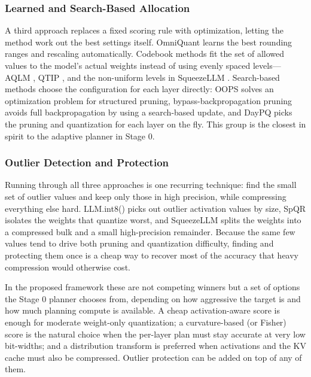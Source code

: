 \documentclass[
11pt, %
english, %
singlespacing, %
headsepline, %
]{MastersDoctoralThesis} %
\begin{document}
\subsubsection{Learned and Search-Based Allocation}

A third approach replaces a fixed scoring rule with optimization, letting the method work out the best settings itself. OmniQuant \cite{shao2024omniquant} learns the best rounding ranges and rescaling automatically. Codebook methods fit the set of allowed values to the model's actual weights instead of using evenly spaced levels---AQLM \cite{egiazarian2024aqlm}, QTIP \cite{tseng2024qtip}, and the non-uniform levels in SqueezeLLM \cite{kim2024squeezellm}. Search-based methods choose the configuration for each layer directly: OOPS \cite{survey2026oops} solves an optimization problem for structured pruning, bypass-backpropagation pruning \cite{gao2025bypass} avoids full backpropagation by using a search-based update, and DayPQ \cite{xu2026daypq} picks the pruning and quantization for each layer on the fly. This group is the closest in spirit to the adaptive planner in Stage 0.

\subsubsection{Outlier Detection and Protection}

Running through all three approaches is one recurring technique: find the small set of outlier values and keep only those in high precision, while compressing everything else hard. LLM.int8() \cite{dettmers2022llmint8} picks out outlier activation values by size, SpQR \cite{dettmers2024spqr} isolates the weights that quantize worst, and SqueezeLLM \cite{kim2024squeezellm} splits the weights into a compressed bulk and a small high-precision remainder. Because the same few values tend to drive both pruning and quantization difficulty, finding and protecting them once is a cheap way to recover most of the accuracy that heavy compression would otherwise cost.

In the proposed framework these are not competing winners but a set of options the Stage 0 planner chooses from, depending on how aggressive the target is and how much planning compute is available. A cheap activation-aware score is enough for moderate weight-only quantization; a curvature-based (or Fisher) score is the natural choice when the per-layer plan must stay accurate at very low bit-widths; and a distribution transform is preferred when activations and the KV cache must also be compressed. Outlier protection can be added on top of any of them.
\end{document}
